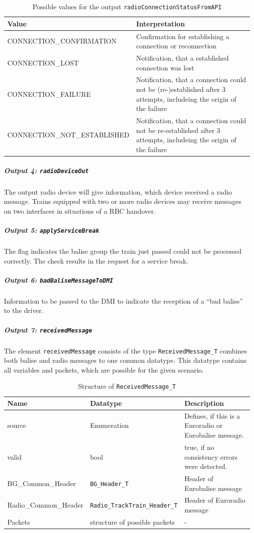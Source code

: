 \documentclass{template/openetcs_report}
\begin{document}
\begin{table}[H]
  \begin{tabular}{| l | p{9cm} |}
    \hline
    \textbf{Value} & \textbf{Interpretation}\\ \hline
    CONNECTION\_CONFIRMATION & Confirmation for establishing a connection or reconnection\\
    CONNECTION\_LOST & Notification, that a established connection was lost\\
    CONNECTION\_FAILURE & Notification, that a connection could not be (re-)established after 3 attempts, includeing the origin of the failure\\
    
    CONNECTION\_NOT\_ESTABLISHED &  Notification, that a connection could not be re-established after 3 attempts, includeing the origin of the failure\\
    \hline
  \end{tabular} 
  \caption{Possible values for the output \texttt{radioConnectionStatusFromAPI}}
  \label{tbl:ConnectionStatusOutput}
\end{table}

\subparagraph{Output 4: \texttt{radioDeviceOut}}
The output radio device will give information, which device received a radio message. Trains equipped with two or more radio devices may receive messages on two interfaces in situations of a RBC handover.

\subparagraph{Output 5: \texttt{applyServiceBreak}}
The flag indicates the balise group the train just passed could not be processed correctly. The check results in the request for a service break.

\subparagraph{Output 6: \texttt{badBaliseMessageToDMI}}
Information to be passed to the DMI to indicate the reception of a ``bad balise'' to the driver.

\subparagraph{Output 7: \texttt{receivedMessage}}
The element \texttt{receivedMessage} consists of the type \texttt{ReceivedMessage\_T} combines both balise and radio messages to one common datatype. This datatype contains all variables and packets, which are possible for the given scenario.

\begin{table}[H]
  \begin{tabular}{| l | l | p{5.5cm} |}
  \hline
  \textbf{Name} & \textbf{Datatype} & \textbf{Description}\\ \hline
  source & Enumeration & Defines, if this is a Euroradio or Eurobalise message.\\
  valid & bool & true, if no consistency errors were detected.\\
  BG\_Common\_Header & \texttt{BG\_Header\_T} & Header of Eurobalise message\\
  Radio\_Common\_Header & \texttt{Radio\_TrackTrain\_Header\_T} & Header of Euroradio message\\
  Packets & structure of possible packets & -\\
  
  \hline
\end{tabular}
  \caption{Structure of \texttt{ReceivedMessage\_T}}
  \label{tbl:receivedMessage_structure}
\end{table}
\end{document}
